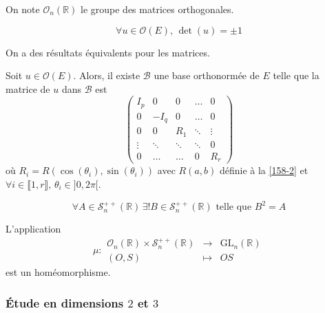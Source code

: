 	\begin{notation}
		On note $\mathcal{O}_n(\mathbb{R})$ le groupe des matrices orthogonales.
	\end{notation}
	
	\begin{theorem}
		\[ \forall u \in \mathcal{O}(E), \, \det(u) = \pm 1 \]
	\end{theorem}
	
	\begin{remark}
		On a des résultats équivalents pour les matrices.
	\end{remark}
	
	\begin{theorem}
		Soit $u \in \mathcal{O}(E)$. Alors, il existe $\mathcal{B}$ une base orthonormée de $E$ telle que la matrice de $u$ dans $\mathcal{B}$ est
		\[ \begin{pmatrix} I_p & 0 & 0 & \dots & 0 \\ 0 & -I_q & 0 & \dots & 0 \\ 0 & 0 & R_1 & \ddots & \vdots \\ \vdots & \ddots & \ddots & \ddots & 0 \\ 0 & \dots & \dots & 0 & R_r \end{pmatrix} \]
		où $R_i = R(\cos(\theta_i), \sin(\theta_i))$ avec $R(a,b)$ définie à la \cref{158-2} et $\forall i \in \llbracket 1, r \rrbracket, \, \theta_i \in ]0,2\pi[$.
	\end{theorem}
	
	
	\begin{lemma}
		\[ \forall A \in \mathcal{S}_n^{++}(\mathbb{R}) \, \exists! B \in \mathcal{S}_n^{++}(\mathbb{R}) \text{ telle que } B^2 = A \]
	\end{lemma}
	
	\begin{theorem}
		L'application
		\[ \mu :
		\begin{array}{ccc}
			\mathcal{O}_n(\mathbb{R}) \times \mathcal{S}_n^{++}(\mathbb{R}) &\rightarrow& \mathrm{GL}_n(\mathbb{R}) \\
			(O, S) &\mapsto& OS
		\end{array}
		\]
		est un homéomorphisme.
	\end{theorem}
	
	\subsubsection{Étude en dimensions \texorpdfstring{$2$}{2} et \texorpdfstring{$3$}{3}}
	
